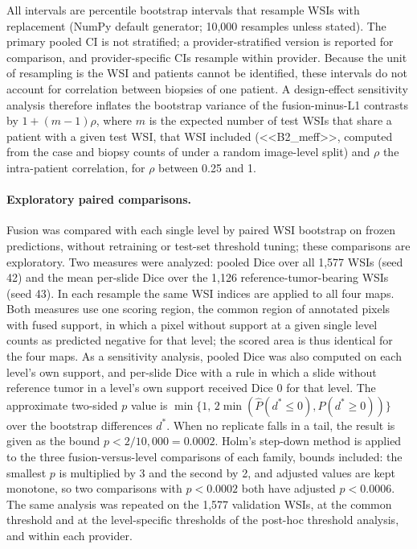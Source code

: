 \documentclass[10pt,letterpaper]{article}
\begin{document}
All intervals are percentile bootstrap intervals that resample WSIs with replacement (NumPy default generator; 10,000 resamples unless stated). The primary pooled CI is not stratified; a provider-stratified version is reported for comparison, and provider-specific CIs resample within provider. Because the unit of resampling is the WSI and patients cannot be identified, these intervals do not account for correlation between biopsies of one patient. A design-effect sensitivity analysis therefore inflates the bootstrap variance of the fusion-minus-L1 contrasts by $1+(m-1)\rho$, where $m$ is the expected number of test WSIs that share a patient with a given test WSI, that WSI included (<<B2_meff>>, computed from the case and biopsy counts of \cite{bib11} under a random image-level split) and $\rho$ the intra-patient correlation, for $\rho$ between 0.25 and 1.

\paragraph{Exploratory paired comparisons.}
Fusion was compared with each single level by paired WSI bootstrap on frozen predictions, without retraining or test-set threshold tuning; these comparisons are exploratory. Two measures were analyzed: pooled Dice over all 1,577 WSIs (seed 42) and the mean per-slide Dice over the 1,126 reference-tumor-bearing WSIs (seed 43). In each resample the same WSI indices are applied to all four maps. Both measures use one scoring region, the common region of annotated pixels with fused support, in which a pixel without support at a given single level counts as predicted negative for that level; the scored area is thus identical for the four maps. As a sensitivity analysis, pooled Dice was also computed on each level's own support, and per-slide Dice with a rule in which a slide without reference tumor in a level's own support received Dice 0 for that level. The approximate two-sided $p$ value is $\min\{1,\,2\min(\hat P(d^*\le 0),\hat P(d^*\ge 0))\}$ over the bootstrap differences $d^*$. When no replicate falls in a tail, the result is given as the bound $p<2/10{,}000=0.0002$. Holm's step-down method \cite{bib40,bib41} is applied to the three fusion-versus-level comparisons of each family, bounds included: the smallest $p$ is multiplied by 3 and the second by 2, and adjusted values are kept monotone, so two comparisons with $p<0.0002$ both have adjusted $p<0.0006$. The same analysis was repeated on the 1,577 validation WSIs, at the common threshold and at the level-specific thresholds of the post-hoc threshold analysis, and within each provider.
\end{document}
